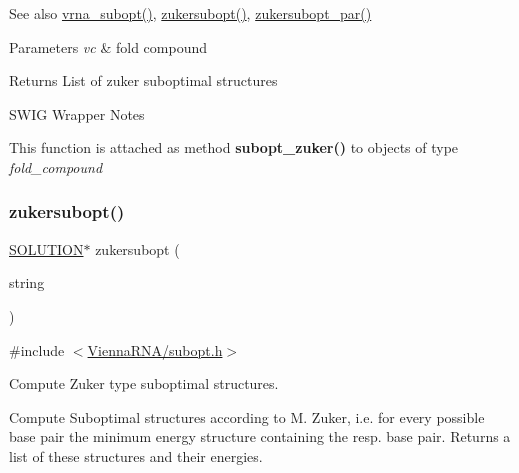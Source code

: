 \begin{DoxySeeAlso}{See also}
\mbox{\hyperlink{group__subopt__wuchty_ga0f11d738fb8c8b1885a90c11c8931ff6}{vrna\+\_\+subopt()}}, \mbox{\hyperlink{group__subopt__zuker_ga0d5104e3ecf119d8eabd40aa5fe47f90}{zukersubopt()}}, \mbox{\hyperlink{group__subopt__zuker_gab6d0ea8cc1d02f6dd831ca81043c9eb8}{zukersubopt\+\_\+par()}}
\end{DoxySeeAlso}

\begin{DoxyParams}{Parameters}
{\em vc} & fold compound \\
\hline
\end{DoxyParams}
\begin{DoxyReturn}{Returns}
List of zuker suboptimal structures
\end{DoxyReturn}
\begin{DoxyRefDesc}{S\+W\+I\+G Wrapper Notes}
\item[\mbox{\hyperlink{wrappers__wrappers000092}{S\+W\+I\+G Wrapper Notes}}]This function is attached as method {\bfseries subopt\+\_\+zuker()} to objects of type {\itshape fold\+\_\+compound} \end{DoxyRefDesc}
\mbox{\label{group__subopt__zuker_ga0d5104e3ecf119d8eabd40aa5fe47f90}} 
\subsubsection{\texorpdfstring{zukersubopt()}{zukersubopt()}}
{\footnotesize\ttfamily \mbox{\hyperlink{subopt_8h_aa0f46ff02e1017469cf902d02ecd7f9a}{S\+O\+L\+U\+T\+I\+ON}}$\ast$ zukersubopt (\begin{DoxyParamCaption}\item[{const char $\ast$}]{string }\end{DoxyParamCaption})}



{\ttfamily \#include $<$\mbox{\hyperlink{subopt_8h}{Vienna\+R\+N\+A/subopt.\+h}}$>$}



Compute Zuker type suboptimal structures. 

Compute Suboptimal structures according to M. Zuker, i.\+e. for every possible base pair the minimum energy structure containing the resp. base pair. Returns a list of these structures and their energies.

